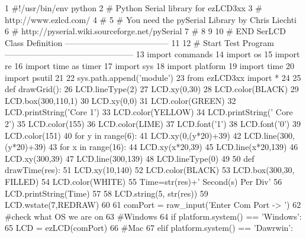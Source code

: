 \begin{DoxyCodeInclude}
1 \textcolor{comment}{#!/usr/bin/env python}
2 \textcolor{comment}{# Python Serial library for ezLCD3xx}
3 \textcolor{comment}{# http://www.ezlcd.com/}
4 \textcolor{comment}{#}
5 \textcolor{comment}{# You need the pySerial Library by Chris Liechti}
6 \textcolor{comment}{# http://pyserial.wiki.sourceforge.net/pySerial}
7 \textcolor{comment}{#}
8 
9 
10 \textcolor{comment}{# END SerLCD Class Definition --------------------------------------}
11 
12 \textcolor{comment}{# Start Test Program -----------------------------------------------}
13 \textcolor{keyword}{import} commands
14 \textcolor{keyword}{import} os
15 \textcolor{keyword}{import} re
16 \textcolor{keyword}{import} time \textcolor{keyword}{as} timer
17 \textcolor{keyword}{import} sys
18 \textcolor{keyword}{import} platform
19 \textcolor{keyword}{import} time
20 \textcolor{keyword}{import} psutil
21     
22 sys.path.append(\textcolor{stringliteral}{'module'}) 
23 \textcolor{keyword}{from} ezLCD3xx \textcolor{keyword}{import} *
24 
25 \textcolor{keyword}{def }drawGrid():
26     LCD.lineType(2)
27     LCD.xy(0,30)
28     LCD.color(BLACK)
29     LCD.box(300,110,1)
30     LCD.xy(0,0)
31     LCD.color(GREEN)
32     LCD.printString(\textcolor{stringliteral}{'Core 1'})
33     LCD.color(YELLOW)
34     LCD.printString(\textcolor{stringliteral}{'  Core 2'})
35     LCD.color(155)
36     LCD.color(LIME)
37     LCD.font(\textcolor{stringliteral}{'1'})
38     LCD.font(\textcolor{stringliteral}{'0'})
39     LCD.color(151)
40     \textcolor{keywordflow}{for} y \textcolor{keywordflow}{in} range(6):
41         LCD.xy(0,(y*20)+39)
42         LCD.line(300,(y*20)+39)
43     \textcolor{keywordflow}{for} x \textcolor{keywordflow}{in} range(16):
44         LCD.xy(x*20,39)
45         LCD.line(x*20,139)
46     LCD.xy(300,39)
47     LCD.line(300,139)
48     LCD.lineType(0)
49     
50 \textcolor{keyword}{def }drawTime(res):
51     LCD.xy(10,140)
52     LCD.color(BLACK)
53     LCD.box(300,30, FILLED)
54     LCD.color(WHITE)
55     Time=str(res)+\textcolor{stringliteral}{' Second(s) Per Div'}
56     LCD.printString(Time)
57 
58     LCD.string(5, str(res))
59     LCD.wstate(7,REDRAW)
60 
61 comPort = raw\_input(\textcolor{stringliteral}{'Enter Com Port -> '})
62 \textcolor{comment}{#check what OS we are on}
63 \textcolor{comment}{#Windows}
64 \textcolor{keywordflow}{if} platform.system() == \textcolor{stringliteral}{'Windows'}:
65     LCD = ezLCD(comPort) 
66 \textcolor{comment}{#Mac}
67 \textcolor{keywordflow}{elif} platform.system() == \textcolor{stringliteral}{'Dawrwin'}:

\end{DoxyCodeInclude}
